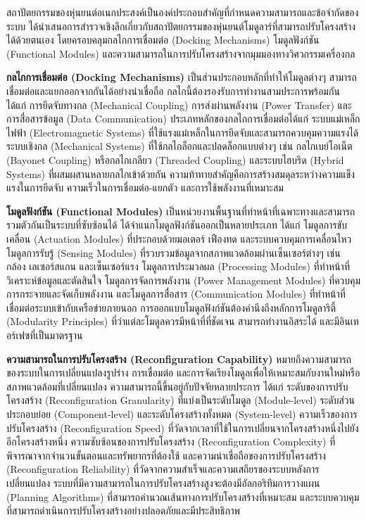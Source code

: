 \documentclass[a4paper]{article}
\begin{document}
สถาปัตยกรรมของหุ่นยนต์อเนกประสงค์เป็นองค์ประกอบสำคัญที่กำหนดความสามารถและข้อจำกัดของระบบ \textcite{post2023modular} ได้นำเสนอการสำรวจเชิงลึกเกี่ยวกับสถาปัตยกรรมของหุ่นยนต์โมดูลาร์ที่สามารถปรับโครงสร้างได้ด้วยตนเอง โดยครอบคลุมกลไกการเชื่อมต่อ (Docking Mechanisms) โมดูลฟังก์ชัน (Functional Modules) และความสามารถในการปรับโครงสร้างจากมุมมองทางวิศวกรรมเครื่องกล

\textbf{กลไกการเชื่อมต่อ (Docking Mechanisms)} เป็นส่วนประกอบหลักที่ทำให้โมดูลต่างๆ สามารถเชื่อมต่อและแยกออกจากกันได้อย่างน่าเชื่อถือ กลไกนี้ต้องรองรับการทำงานสามประการพร้อมกัน ได้แก่ การยึดจับทางกล (Mechanical Coupling) การส่งผ่านพลังงาน (Power Transfer) และการสื่อสารข้อมูล (Data Communication) \parencite{hameed2017modular} ประเภทหลักของกลไกการเชื่อมต่อได้แก่ ระบบแม่เหล็กไฟฟ้า (Electromagnetic Systems) ที่ใช้แรงแม่เหล็กในการยึดจับและสามารถควบคุมความแรงได้ ระบบเชิงกล (Mechanical Systems) ที่ใช้กลไกล็อกและปลดล็อกแบบต่างๆ เช่น กลไกเบย์โอเน็ต (Bayonet Coupling) หรือกลไกเกลียว (Threaded Coupling) และระบบไฮบริด (Hybrid Systems) ที่ผสมผสานหลายกลไกเข้าด้วยกัน ความท้าทายสำคัญคือการสร้างสมดุลระหว่างความแข็งแรงในการยึดจับ ความเร็วในการเชื่อมต่อ-แยกตัว และการใช้พลังงานที่เหมาะสม

\textbf{โมดูลฟังก์ชัน (Functional Modules)} เป็นหน่วยงานพื้นฐานที่ทำหน้าที่เฉพาะทางและสามารถรวมตัวกันเป็นระบบที่ซับซ้อนได้ \textcite{bi2016survey} ได้จำแนกโมดูลฟังก์ชันออกเป็นหลายประเภท ได้แก่ โมดูลการขับเคลื่อน (Actuation Modules) ที่ประกอบด้วยมอเตอร์ เฟืองทด และระบบควบคุมการเคลื่อนไหว โมดูลการรับรู้ (Sensing Modules) ที่รวบรวมข้อมูลจากสภาพแวดล้อมผ่านเซ็นเซอร์ต่างๆ เช่น กล้อง เลเซอร์สแกน และเซ็นเซอร์แรง โมดูลการประมวลผล (Processing Modules) ที่ทำหน้าที่วิเคราะห์ข้อมูลและตัดสินใจ โมดูลการจัดการพลังงาน (Power Management Modules) ที่ควบคุมการกระจายและจัดเก็บพลังงาน และโมดูลการสื่อสาร (Communication Modules) ที่ทำหน้าที่เชื่อมต่อระบบเข้ากับเครือข่ายภายนอก การออกแบบโมดูลฟังก์ชันต้องคำนึงถึงหลักการโมดูลาริตี้ (Modularity Principles) ที่ว่าแต่ละโมดูลควรมีหน้าที่ที่ชัดเจน สามารถทำงานอิสระได้ และมีอินเทอร์เฟซที่เป็นมาตรฐาน

\textbf{ความสามารถในการปรับโครงสร้าง (Reconfiguration Capability)} หมายถึงความสามารถของระบบในการเปลี่ยนแปลงรูปร่าง การเชื่อมต่อ และการจัดเรียงโมดูลเพื่อให้เหมาะสมกับงานใหม่หรือสภาพแวดล้อมที่เปลี่ยนแปลง ความสามารถนี้ขึ้นอยู่กับปัจจัยหลายประการ \parencite{seo2019modular} ได้แก่ ระดับของการปรับโครงสร้าง (Reconfiguration Granularity) ที่แบ่งเป็นระดับโมดูล (Module-level) ระดับส่วนประกอบย่อย (Component-level) และระดับโครงสร้างทั้งหมด (System-level) ความเร็วของการปรับโครงสร้าง (Reconfiguration Speed) ที่วัดจากเวลาที่ใช้ในการเปลี่ยนจากโครงสร้างหนึ่งไปยังอีกโครงสร้างหนึ่ง ความซับซ้อนของการปรับโครงสร้าง (Reconfiguration Complexity) ที่พิจารณาจากจำนวนขั้นตอนและทรัพยากรที่ต้องใช้ และความน่าเชื่อถือของการปรับโครงสร้าง (Reconfiguration Reliability) ที่วัดจากความสำเร็จและความเสถียรของระบบหลังการเปลี่ยนแปลง ระบบที่มีความสามารถในการปรับโครงสร้างสูงจะต้องมีอัลกอริทึมการวางแผน (Planning Algorithms) ที่สามารถคำนวณเส้นทางการปรับโครงสร้างที่เหมาะสม และระบบควบคุมที่สามารถดำเนินการปรับโครงสร้างอย่างปลอดภัยและมีประสิทธิภาพ
\end{document}
